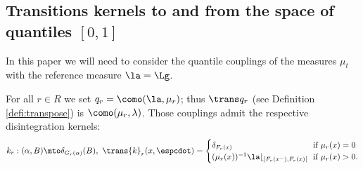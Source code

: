 \subsection{Transitions kernels to and from the space of quantiles \mb$[0,1]$\mn}\label{subsec:little_t}
In this paper we will need to consider the quantile couplings of the measures $\mu_t$ with the reference measure $\la=\Lg$.

\begin{notation}[$q_r$, $k_r$, $\trans k_r$] \label{notation:kernels} For all $r\in R$ we set $q_r= \como(\la,\mu_r)$; thus $\trans q_r$ (see Definition \ref{defi:transpose}) is $\como(\mu_r, \lambda)$. Those couplings admit the respective disintegration kernels:\vspace*{-3pt}
\begin{align*}
k_r:(\alpha,B)\mto \delta_{G_{r}(\alpha)}(B),\ \trans{k}_r(x,\espcdot)=
\begin{cases}
\delta_{F_r(x)}&\!\!\text{if }\mu_r(x)=0\\
(\mu_r(x))^{-1}\la\lfloor_{]F_r(x^-),F_r(x)[}&\!\!\text{if }\mu_r(x)>0.\\
\end{cases}
\end{align*}
\end{notation}

